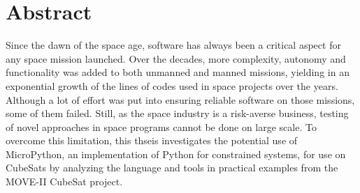\cleardoublepage
\section*{Abstract}

Since the dawn of the space age, software has always been a critical aspect for any space mission launched. Over the decades, more complexity, autonomy and functionality was added to both unmanned and manned missions, yielding in an exponential growth of the lines of codes used in space projects over the years. Although a lot of effort was put into ensuring reliable software on those missions, some of them failed.  Still, as the space industry is a risk-averse business, testing of novel approaches in space programs cannot be done on large scale. To overcome this limitation, this thseis investigates the potential use of MicroPython, an implementation of Python for constrained systems, for use on CubeSats by analyzing the language and tools in practical examples from the MOVE-II CubeSat project.
